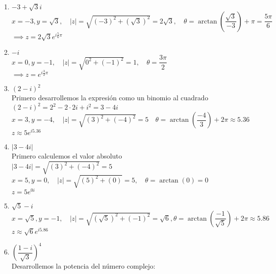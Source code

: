 \documentclass[twoside]{book}
\begin{document}
\begin{sol}
\begin{solucion}{}
\begin{enumerate}
            \item $-3+\sqrt{3}i$\\
                  $x=-3,y=\sqrt{3},\quad |z|=\sqrt{(-3)^2+\left(\sqrt{3}\right)^2}=2\sqrt{3},\quad \theta=\arctan\left(\dfrac{\sqrt{3}}{-3}\right)+\pi=\dfrac{5\pi}{6}$\\
                  $\implies \boxed{z=2\sqrt{3} e^{i\frac{5}{6}\pi}}$
            \item $-i$\\
                  $x=0, y=-1, \quad |z|=\sqrt{0^2+\left(-1\right)^2}=1, \quad \theta=\dfrac{3\pi}{2}$\\
                  $\implies \boxed{z=e^{i\frac{3}{2}\pi}}$
            \item $(2-i)^2$\\
                  Primero desarrollemos la expresi\'on como un binomio al cuadrado
                  \\$(2-i)^2=2^2-2\cdot2i+i^2=3-4i$\\
                  $x=3,y=-4,\quad |z|=\sqrt{\left(3\right)^2+\left(-4\right)^2}=5\quad \theta=\arctan\left(\dfrac{-4}{3}\right)+2\pi\approx5.36$\\
                  $\boxed{z\approx5e^{i5.36}}$
            \item $|3-4i|$\\
                  Primero calculemos el valor absoluto\\
                  $|3-4i|=\sqrt{\left(3\right)^2+\left(-4\right)^2}=5$\\
                  $x=5,y=0,\quad |z|=\sqrt{\left(5\right)^2+\left(0\right)}=5,\quad \theta=\arctan(0)=0$\\
                  $\boxed{z=5e^{0i}}$
            \item $\sqrt{5}-i$\\
                  $x=\sqrt{5},y=-1,\quad |z|=\sqrt{\left(\sqrt{5}\right)^2+\left(-1\right)^2}=\sqrt{6},\theta=\arctan\left(\dfrac{-1}{\sqrt{5}}\right)+2\pi\approx5.86$\\
                  $\boxed{z\approx\sqrt{6}e^{i5.86}}$
            \item $\left(\dfrac{1-i}{\sqrt{3}}\right)^4$\\
                  Desarrollemos la potencia del n\'umero complejo:
                  \begin{eqnarray*}

\end{eqnarray*}
\end{enumerate}
\end{solucion}
\end{sol}
\end{document}
